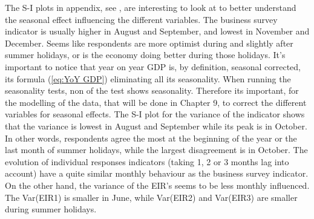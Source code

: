 \documentclass[12pt,a4paper,oneside]{book}
\begin{document}
The S-I plots in appendix, see , are interesting to look at to better understand the seasonal effect influencing the different variables.
The business survey indicator is usually higher in August and September, and lowest in November and December. 
Seems like respondents are more optimist during and slightly after summer holidays, or is the economy doing better during those holidays.
It's important to notice that year on year GDP is, by definition, seasonal corrected, its formula (\autoref{eq:YoY GDP}) eliminating all its seasonality.
When running the seasonality tests, non of the test shows seasonality.
Therefore its important, for the modelling of the data, that will be done in Chapter 9, to correct the different variables for seasonal effects.
The S-I plot for the variance of the indicator shows that the variance is lowest in August and September while its peak is in October. In other words, respondents agree the most at the beginning of the year or the last month of summer holidays, while the largest disagreement is in October. 
The evolution of individual responses indicators (taking 1, 2 or 3 months lag into account) have a quite similar monthly behaviour as the business survey indicator.
On the other hand, the variance of the EIR's seems to be less monthly influenced. The Var(EIR1) is smaller in June, while Var(EIR2) and Var(EIR3) are smaller during summer holidays.
\end{document}
